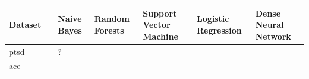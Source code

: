 \documentclass[
]{book}
\begin{document}
\begin{longtable}[]{@{}lllllll@{}}
\toprule
\begin{minipage}[b]{0.29\columnwidth}\raggedright
Dataset\strut
\end{minipage} & \begin{minipage}[b]{0.03\columnwidth}\raggedright
\strut
\end{minipage} & \begin{minipage}[b]{0.10\columnwidth}\raggedright
Naive Bayes\strut
\end{minipage} & \begin{minipage}[b]{0.10\columnwidth}\raggedright
Random Forests\strut
\end{minipage} & \begin{minipage}[b]{0.10\columnwidth}\raggedright
Support Vector Machine\strut
\end{minipage} & \begin{minipage}[b]{0.10\columnwidth}\raggedright
Logistic Regression\strut
\end{minipage} & \begin{minipage}[b]{0.10\columnwidth}\raggedright
Dense Neural Network\strut
\end{minipage}\tabularnewline
\midrule
\endhead
\begin{minipage}[t]{0.29\columnwidth}\raggedright
ptsd\strut
\end{minipage} & \begin{minipage}[t]{0.03\columnwidth}\raggedright
\strut
\end{minipage} & \begin{minipage}[t]{0.10\columnwidth}\raggedright
?\strut
\end{minipage} & \begin{minipage}[t]{0.10\columnwidth}\raggedright
\strut
\end{minipage} & \begin{minipage}[t]{0.10\columnwidth}\raggedright
\strut
\end{minipage} & \begin{minipage}[t]{0.10\columnwidth}\raggedright
\strut
\end{minipage} & \begin{minipage}[t]{0.10\columnwidth}\raggedright
\strut
\end{minipage}\tabularnewline
\begin{minipage}[t]{0.29\columnwidth}\raggedright
ace\strut
\end{minipage} & \begin{minipage}[t]{0.03\columnwidth}\raggedright

\end{minipage}
\end{longtable}
\end{document}
